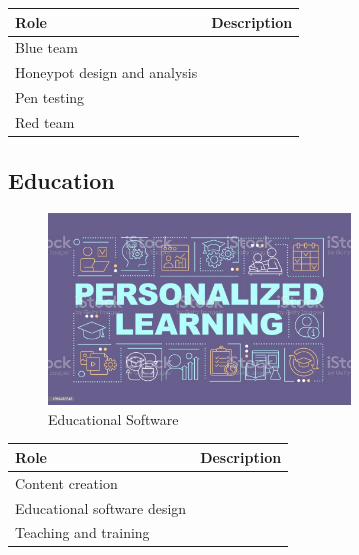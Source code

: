 \begin{table}[H]
	\begin{center}
		\begin{tabular}{p{1.3in}|p{3in}} 
			\textbf{Role} & \textbf{Description}\\
			\hline
			Blue team & \\
			\hline
			Honeypot design and analysis & \\
			\hline
			Pen testing & \\
			\hline
			Red team & \\
		\end{tabular}
	\end{center}
\end{table}


\subsection{Education}

\begin{figure}[H]
	\begin{center}
		\caption{Educational Software}
		\vskip 4pt
		\includegraphics[height=2in]{images/careers/istockphoto-1394432243-1024x1024.jpg}
	\end{center}
\end{figure}

\begin{table}[H]
	\begin{center}
		\begin{tabular}{p{1.3in}|p{3in}} 
			\textbf{Role} & \textbf{Description}\\
			\hline
			Content creation & \\
			\hline
			Educational software design & \\
			\hline
			Teaching and training & \\
		\end{tabular}
	\end{center}
\end{table}

